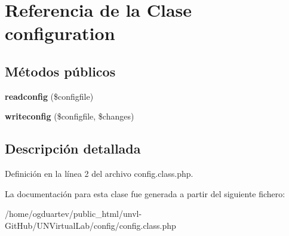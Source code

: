 \hypertarget{classconfiguration}{}\section{Referencia de la Clase configuration}
\label{classconfiguration}
\subsection*{Métodos públicos}
\begin{DoxyCompactItemize}
\item 
\mbox{\label{classconfiguration_a67baa5b1b19e6ab5b7d99d3704804f30}} 
{\bfseries readconfig} (\$configfile)
\item 
\mbox{\label{classconfiguration_ac2a22ec1c4e26f015276561876d2e48f}} 
{\bfseries writeconfig} (\$configfile, \$changes)
\end{DoxyCompactItemize}


\subsection{Descripción detallada}


Definición en la línea 2 del archivo config.\+class.\+php.



La documentación para esta clase fue generada a partir del siguiente fichero\+:\begin{DoxyCompactItemize}
\item 
/home/ogduartev/public\+\_\+html/unvl-\/\+Git\+Hub/\+U\+N\+Virtual\+Lab/config/config.\+class.\+php\end{DoxyCompactItemize}
